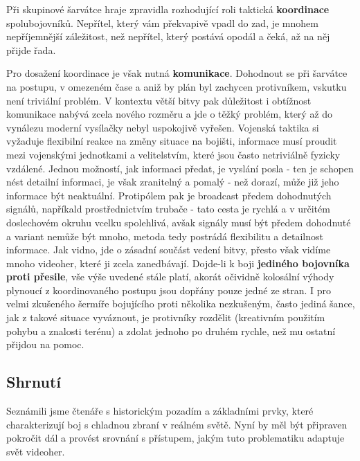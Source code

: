 Při skupinové šarvátce hraje zpravidla rozhodující roli taktická \textbf{koordinace} spolubojovníků. Nepřítel, který vám překvapivě vpadl do zad, je mnohem nepříjemnější záležitost, než nepřítel, který postává opodál a čeká, až na něj přijde řada.  

Pro dosažení koordinace je však nutná \textbf{komunikace}. Dohodnout se při šarvátce na postupu, v omezeném čase a aniž by plán byl zachycen protivníkem, vskutku není triviální problém. V kontextu větší bitvy pak důležitost i obtížnost komunikace nabývá zcela nového rozměru a jde o těžký problém, který až do vynálezu moderní vysílačky nebyl uspokojivě vyřešen. Vojenská taktika si vyžaduje flexibilní reakce na změny situace na bojišti, informace musí proudit mezi vojenskými jednotkami a velitelstvím, které jsou často netriviálně fyzicky vzdálené. Jednou možností, jak informaci předat, je vyslání posla - ten je schopen nést detailní informaci, je však zranitelný a pomalý - než dorazí, může již jeho informace být neaktuální. Protipólem pak je broadcast předem dohodnutých signálů, napříkald prostřednictvím trubače - tato cesta je rychlá a v určitém doslechovém okruhu vcelku spolehlivá, avšak signály musí být předem dohodnuté a variant nemůže být mnoho, metoda tedy postrádá flexibilitu a detailnost informace. Jak vidno, jde o zásadní součást vedení bitvy, přesto však vidíme mnoho videoher, které ji zcela zanedbávají.
\bigbreak
Dojde-li k boji \textbf{jediného bojovníka proti přesile}, vše výše uvedené stále platí, akorát očividně kolosální výhody plynoucí z koordinovaného postupu jsou dopřány pouze jedné ze stran. I pro velmi zkušeného šermíře bojujícího proti několika nezkušeným, často jediná šance, jak z takové situace vyváznout, je protivníky rozdělit (kreativním použitím pohybu a znalosti terénu) a zdolat jednoho po druhém rychle, než mu ostatní přijdou na pomoc.

\subsection*{Shrnutí}
Seznámili jsme čtenáře s historickým pozadím a základními prvky, které charakterizují boj s chladnou zbraní v reálném světě. Nyní by měl být připraven pokročit dál a provést srovnání s přístupem, jakým tuto problematiku adaptuje svět videoher.

\clearpage


